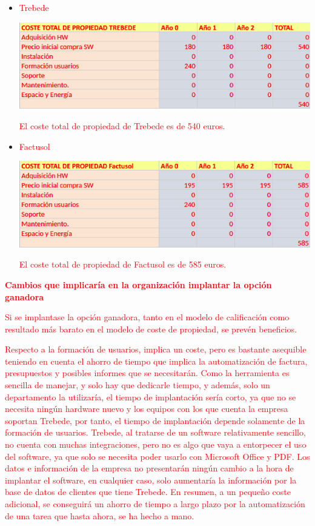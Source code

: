 \documentclass{article}
\begin{document}
\begin{itemize}
\item \textcolor{Red}{Trebede}
\begin{center}
\includegraphics[scale=0.5]{images/trebede.png}
\end{center}
\textcolor{Red}{El coste total de propiedad de Trebede es de 540 euros.}
\item \textcolor{Red}{Factusol}
\begin{center}
\includegraphics[scale=0.5]{images/factusol.png}
\end{center}
\textcolor{Red}{El coste total de propiedad de Factusol es de 585 euros.}
\end{itemize}

\textcolor{Red}{\textbf{Cambios que implicaría en la organización implantar la opción ganadora}}

\textcolor{Red}{Si se implantase la opción ganadora, tanto en el modelo de calificación como resultado más barato en el modelo de coste de propiedad, se prevén beneficios.} 

\textcolor{Red}{Respecto a la formación de usuarios, implica un coste, pero es bastante asequible teniendo en cuenta el ahorro de tiempo que implica la automatización de factura, presupuestos y posibles informes que se necesitarán. Como la herramienta es sencilla de manejar, y solo hay que dedicarle tiempo, y además, solo un departamento la utilizaría, el tiempo de implantación sería corto, ya que no se necesita ningún hardware nuevo y los equipos con los que cuenta la empresa soportan Trebede, por tanto, el tiempo de implantación depende solamente de la formación de usuarios. Trebede, al tratarse de un software relativamente sencillo, no cuenta con muchas integraciones, pero no es algo que vaya a entorpecer el uso del software, ya que solo se necesita poder usarlo con Microsoft Office y  PDF. Los datos e información de la empresa no presentarán ningún cambio a la hora de implantar el software, en cualquier caso, solo aumentaría la información por la base de datos de clientes que tiene Trebede. En resumen, a un pequeño coste adicional, se conseguirá un ahorro de tiempo a largo plazo por la automatización de una tarea que hasta ahora, se ha hecho a mano.}
\end{document}

